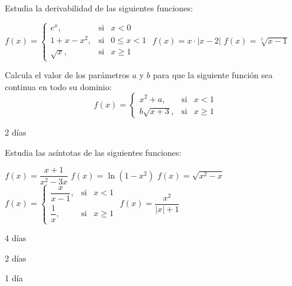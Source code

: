 \begin{ejemplo}{Estudia la derivabilidad de las siguientes funciones:
\begin{apartados}
 \ap $f(x)=\left\{\begin{array}{lcc}
        e^x,    &\text{si}&x<0\\
        1+x-x^2, &\text{si}&0\leqslant x<1\\
        \sqrt{x},&\text{si}&x\geqslant1
    \end{array}\right.$
 \ap $f(x)=x\cdot|x-2|$
 \ap $f(x)=\sqrt[5]{x-1}$
\end{apartados}}
\end{ejemplo}

\begin{ejemplo}{Calcula el valor de los parámetros $a$ y $b$ para que la siguiente función sea continua en todo su dominio:
    \[
    f(x)=\left\{\begin{array}{lcc}
        x^2+a,&\text{si}&x<1\\[5pt]
        b\sqrt{x+3},&\text{si}&x\geqslant1
    \end{array}\right.
    \]}
\end{ejemplo}

\begin{definicion}{2 días}
\end{definicion}

\begin{ejemplo}{Estudia las asíntotas de las siguientes funciones:
\begin{apartados}
 \ap $f(x)=\dfrac{x+1}{x^2-3x}$
 \ap $f(x)=\ln{(1-x^2)}$
 \ap $f(x)=\sqrt{x^2-x}$
 \ap $f(x)=\left\{\begin{array}{lcc}
        \dfrac{x}{x-1},&\text{si}&x<1\\[10pt]
        \dfrac1x,&\text{si}&x\geqslant1
    \end{array}\right.$
 \ap $f(x)=\dfrac{x^2}{|x|+1}$
\end{apartados}}
\end{ejemplo}

\begin{definicion}{4 días}
\end{definicion}

\begin{definicion}{2 días}
\end{definicion}

\begin{definicion}{1 día}
\end{definicion}

